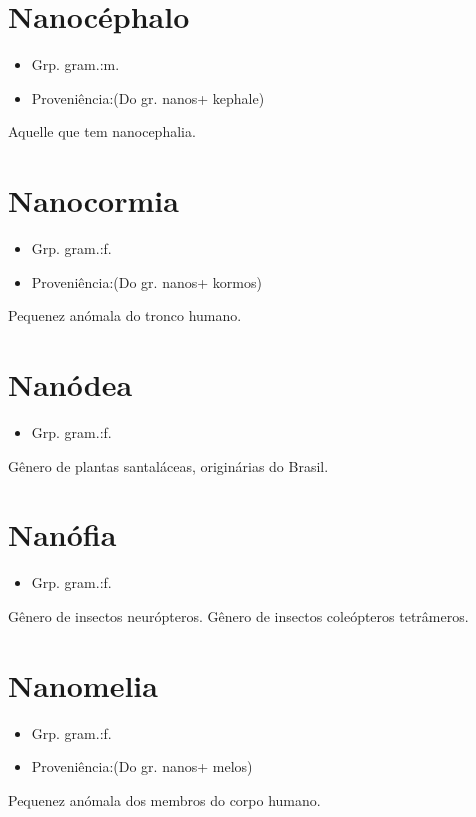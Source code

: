 \section{Nanocéphalo}
\begin{itemize}
\item {Grp. gram.:m.}
\end{itemize}
\begin{itemize}
\item {Proveniência:(Do gr. \textunderscore nanos\textunderscore  + \textunderscore kephale\textunderscore )}
\end{itemize}
Aquelle que tem nanocephalia.
\section{Nanocormia}
\begin{itemize}
\item {Grp. gram.:f.}
\end{itemize}
\begin{itemize}
\item {Proveniência:(Do gr. \textunderscore nanos\textunderscore  + \textunderscore kormos\textunderscore )}
\end{itemize}
Pequenez anómala do tronco humano.
\section{Nanódea}
\begin{itemize}
\item {Grp. gram.:f.}
\end{itemize}
Gênero de plantas santaláceas, originárias do Brasil.
\section{Nanófia}
\begin{itemize}
\item {Grp. gram.:f.}
\end{itemize}
Gênero de insectos neurópteros.
Gênero de insectos coleópteros tetrâmeros.
\section{Nanomelia}
\begin{itemize}
\item {Grp. gram.:f.}
\end{itemize}
\begin{itemize}
\item {Proveniência:(Do gr. \textunderscore nanos\textunderscore  + \textunderscore melos\textunderscore )}
\end{itemize}
Pequenez anómala dos membros do corpo humano.
